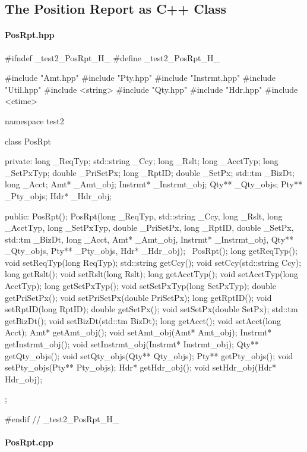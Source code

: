 \documentclass[submission]{eptcs}
\begin{document}
\subsection{The Position Report as C++ Class}
\label{sec:posrpt:cpp}

\paragraph{PosRpt.hpp}

\begin{cppcode}
#ifndef _test2_PosRpt_H_
#define _test2_PosRpt_H_

#include "Amt.hpp"
#include "Pty.hpp"
#include "Instrmt.hpp"
#include "Util.hpp"
#include <string>
#include "Qty.hpp"
#include "Hdr.hpp"
#include <ctime>

namespace test2 {
  class PosRpt {
  private:
    long _ReqTyp;
    std::string _Ccy;
    long _Rslt;
    long _AcctTyp;
    long _SetPxTyp;
    double _PriSetPx;
    long _RptID;
    double _SetPx;
    std::tm _BizDt;
    long _Acct;
    Amt* _Amt_obj;
    Instrmt* _Instrmt_obj;
    Qty** _Qty_objs;
    Pty** _Pty_objs;
    Hdr* _Hdr_obj;

  public:
    PosRpt();
    PosRpt(long _ReqTyp, std::string _Ccy, long _Rslt, long _AcctTyp, long _SetPxTyp, double _PriSetPx, long _RptID,
           double _SetPx, std::tm _BizDt, long _Acct, Amt* _Amt_obj, Instrmt* _Instrmt_obj, Qty** _Qty_objs,
           Pty** _Pty_objs, Hdr* _Hdr_obj);
    ~PosRpt();
    long getReqTyp();
    void setReqTyp(long ReqTyp);
    std::string getCcy();
    void setCcy(std::string Ccy);
    long getRslt();
    void setRslt(long Rslt);
    long getAcctTyp();
    void setAcctTyp(long AcctTyp);
    long getSetPxTyp();
    void setSetPxTyp(long SetPxTyp);
    double getPriSetPx();
    void setPriSetPx(double PriSetPx);
    long getRptID();
    void setRptID(long RptID);
    double getSetPx();
    void setSetPx(double SetPx);
    std::tm getBizDt();
    void setBizDt(std::tm BizDt);
    long getAcct();
    void setAcct(long Acct);
    Amt* getAmt_obj();
    void setAmt_obj(Amt* Amt_obj);
    Instrmt* getInstrmt_obj();
    void setInstrmt_obj(Instrmt* Instrmt_obj);
    Qty** getQty_objs();
    void setQty_objs(Qty** Qty_objs);
    Pty** getPty_objs();
    void setPty_objs(Pty** Pty_objs);
    Hdr* getHdr_obj();
    void setHdr_obj(Hdr* Hdr_obj);
  };
}

#endif // _test2_PosRpt_H_
\end{cppcode}

\paragraph{PosRpt.cpp}
\end{document}
